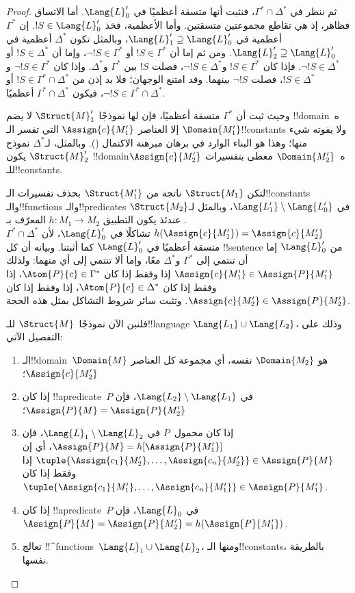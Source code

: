 \documentclass[../../../include/open-logic-section]{subfiles}
\begin{document}
\begin{proof}
ثم ننظر في $\Gamma^* \cap \Delta^*$، فنثبت أنها متسقة أعظميًا في
$\Lang{L}'_0$. أما الاتساق فظاهر، إذ هي تقاطع مجموعتين متسقتين. وأما
الأعظمية، فخذ $!S \in \Lang{L}'_0$. إن $\Gamma^*$ أعظمية في
$\Lang{L}'_1 \supseteq \Lang{L}'_0$، وبالمثل تكون $\Delta^*$ أعظمية
في $\Lang{L}'_2 \supseteq \Lang{L}'_0$. ومن ثم إما أن
$!S \in \Gamma^*$ أو $\lnot !S \in \Gamma^*$، وإما أن
$!S \in \Delta^*$ أو $\lnot !S \in \Delta^*$. فإذا كان
$!S \in \Gamma^*$ و$\lnot !S \in \Delta^*$، فصلت $!S$ بين
$\Gamma^*$ و$\Delta^*$. وإذا كان $\lnot !S \in \Gamma^*$ و
$!S \in \Delta^*$، فصلت $\lnot !S$ بينهما. وقد امتنع الوجهان؛ فلا بد إذن من
$!S \in \Gamma^* \cap \Delta^*$ أو
$\lnot !S \in \Gamma^* \cap \Delta^*$، فيكون
$\Gamma^* \cap \Delta^*$ أعظميًا.

وحيث ثبت أن $\Gamma^*$ متسقة أعظميًا، فإن لها نموذجًا $\Struct{M}'_1$ لا يضم
!!{domain}ه~$\Domain{M'_1}$ إلا العناصر $\Assign{c}{M'_1}$ التي تفسر
الـ!!{constant}s ولا يفوته شيء منها؛ وهذا هو البناء الوارد في برهان مبرهنة الاكتمال
(). وبالمثل، لـ$\Delta^*$ نموذج
$\Struct{M}'_2$ يكون !!{domain}ه~$\Domain{M'_2}$ معطى بتفسيرات
$\Assign{c}{M'_2}$ للـ!!{constant}s.

لتكن $\Struct{M_1}$ ناتجة من $\Struct{M'_1}$ بحذف تفسيرات
الـ!!{constant}s والـ!!{function}s والـ!!{predicate}s في
$\Lang{L'_1} \setminus \Lang{L'_0}$، وبالمثل لـ$\Struct{M_2}$.
عندئذ يكون التطبيق $h \colon M_1 \to M_2$ المعرّف بـ
$h(\Assign{c}{M'_1})=\Assign{c}{M'_2}$ تشاكلًا في $\Lang{L}'_0$، لأن
$\Gamma^* \cap \Delta^*$ متسقة أعظميًا في $\Lang{L}'_0$ كما أثبتنا.
وبيانه أن كل !!{sentence} من $\Lang{L}'_0$ إما أن تنتمي إلى
$\Gamma^*$ و$\Delta^*$ معًا، وإما ألا تنتمي إلى أي منهما: ولذلك
$\Assign{c}{M'_1} \in \Assign{P}{M'_1}$ إذا وفقط إذا كان
$\Atom{P}{c} \in \Gamma^*$، إذا وفقط إذا كان
$\Atom{P}{c} \in \Delta^*$، إذا وفقط إذا كان
$\Assign{c}{M'_2} \in \Assign{P}{M'_2}$. وتثبت سائر شروط
التشاكل بمثل هذه الحجة.

فلنبن الآن نموذجًا~$\Struct{M}$ للـ!!{language}
$\Lang{L_1} \cup \Lang{L_2}$، وذلك على التفصيل الآتي:
\begin{enumerate}
\item الـ!!{domain}~$\Domain{M}$ هو $\Domain{M_2}$ نفسه، أي مجموعة كل
  العناصر $\Assign{c}{M'_2}$؛
\item إذا كان !!a{predicate}~$P$ في
  $\Lang{L_2} \setminus \Lang{L_1}$، فإن
  $\Assign{P}{M}=\Assign{P}{M'_2}$؛
\item إذا كان محمول~$P$ في $\Lang{L}_1\setminus \Lang{L}_2$، فإن
  $\Assign{P}{M}=h[\Assign{P}{M'_1}]$، أي إن
  $\tuple{\Assign{c_1}{M'_2},\dots,\Assign{c_n}{M'_2}} \in
  \Assign{P}{M}$ إذا وفقط إذا كان
  $\tuple{\Assign{c_1}{M'_1},\dots,\Assign{c_n}{M'_1}} \in
  \Assign{P}{M'_1}$.
\item إذا كان !!a{predicate}~$P$ في $\Lang{L}_0$، فإن
  $\Assign{P}{M}=\Assign{P}{M'_2}=h(\Assign{P}{M'_1})$.
\item تعالج !!^{function}s~$\Lang{L}_1 \cup \Lang{L}_2$، ومنها
  الـ!!{constant}s، بالطريقة نفسها.
\end{enumerate}


\end{proof}
\end{document}
